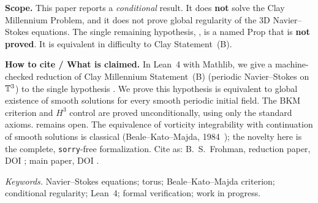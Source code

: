 \documentclass[11pt]{article}
\begin{document}

\begin{scopebox}
\textbf{Scope.} This paper reports a \emph{conditional} result. It does \textbf{not} solve the Clay Millennium Problem, and it does not prove global regularity of the 3D Navier--Stokes equations. The single remaining hypothesis, , is a named Prop that is \textbf{not proved}. It is equivalent in difficulty to Clay Statement~(B).
\end{scopebox}
\begin{citebox}
\textbf{How to cite / What is claimed.} In Lean~4 with Mathlib, we give a machine-checked reduction of Clay Millennium Statement~(B) (periodic Navier--Stokes on $\TT$) to the single hypothesis . We prove this hypothesis is equivalent to global existence of smooth solutions for every smooth periodic initial field. The BKM criterion and $H^3$ control are proved unconditionally, using only the standard axioms.  remains open. The equivalence of vorticity integrability with continuation of smooth solutions is classical (Beale--Kato--Majda, 1984~\cite{BKM1984}); the novelty here is the complete, \texttt{sorry}-free formalization. Cite as: B.~S.~Frohman, reduction paper, DOI ; main paper, DOI .
\end{citebox}

\begin{abstract}
In the Lean~4/Mathlib~\cite{Lean4,Mathlib2020} repository  (commit ), we prove two results with no hypothesis Props:
\begin{itemize}
\item $H^3$ Beale--Kato--Majda control on $\TT$, ;
\item the periodic BKM blow-up criterion~\cite{BKM1984}, .
\end{itemize}
We deduce the exact periodic Clay Statement~(B)~\cite{Fefferman2000}, , \emph{conditionally} on the single named Prop  (). The axioms used are only ,  and .
\end{abstract}
\begin{mscblock}\msc
\textit{Keywords.} Navier--Stokes equations; torus; Beale--Kato--Majda criterion; conditional regularity; Lean~4; formal verification; work in progress.
\end{mscblock}
\end{document}
